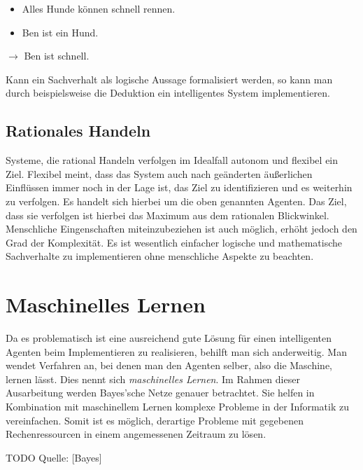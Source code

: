\begin{itemize}
\item Alles Hunde können schnell rennen.
\item Ben ist ein Hund.
\end{itemize}
$\rightarrow$ Ben ist schnell.

Kann ein Sachverhalt als logische Aussage formalisiert werden, so kann man durch beispielsweise die Deduktion ein intelligentes System implementieren. 

\subsection{Rationales Handeln}
Systeme, die rational Handeln verfolgen im Idealfall autonom und flexibel ein Ziel. Flexibel meint, dass das System auch nach geänderten äußerlichen Einflüssen immer noch in der Lage ist, das Ziel zu identifizieren und es weiterhin zu verfolgen. Es handelt sich hierbei um die oben genannten Agenten. Das Ziel, dass sie verfolgen ist hierbei das Maximum aus dem rationalen Blickwinkel. Menschliche Eingenschaften miteinzubeziehen ist auch möglich, erhöht jedoch den Grad der Komplexität. Es ist wesentlich einfacher logische und mathematische Sachverhalte zu implementieren ohne menschliche Aspekte zu beachten.

\section{Maschinelles Lernen}
Da es problematisch ist eine ausreichend gute Lösung für einen intelligenten Agenten beim Implementieren zu realisieren, behilft man sich anderweitig. Man wendet Verfahren an, bei denen man den Agenten selber, also die Maschine, lernen lässt. Dies nennt sich \textit{maschinelles Lernen}.
Im Rahmen dieser Ausarbeitung werden Bayes'sche Netze genauer betrachtet. Sie helfen in Kombination mit maschinellem Lernen komplexe Probleme in der Informatik zu vereinfachen. Somit ist es möglich, derartige Probleme mit gegebenen Rechenressourcen in einem angemessenen Zeitraum zu lösen. 

TODO Quelle: [Bayes]




